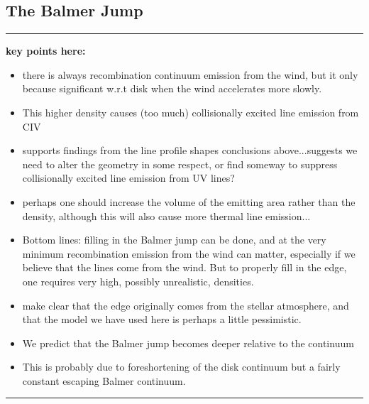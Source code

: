 \documentclass[preprint, a4paper, 11pt]{aastex}
\begin{document}
\subsection{The Balmer Jump}

\label{balmerjump}

\noindent\rule{16cm}{0.4pt}

{\bf
\noindent key points here:

\begin{itemize}
	\item there is always recombination continuum emission from the wind, but it
	only because significant w.r.t disk when the wind accelerates more slowly.
	\item This higher density causes (too much) collisionally excited line emission from CIV
	\item supports findings from the line profile shapes conclusions above...suggests
	we need to alter the geometry in some respect, or find someway to suppress
	collisionally excited line emission from UV lines?
	\item perhaps one should increase the volume of the emitting area rather than the density,
	although this will also cause more thermal line emission...
	\item Bottom lines: filling in the Balmer jump can be done, and at the very minimum recombination
	emission from the wind can matter, especially if we believe that the lines come from the wind. 
	But to properly fill in the edge, one requires very high, possibly unrealistic, densities.
	\item make clear that the edge originally comes from the stellar atmosphere, and that
	the model we have used here is perhaps a little pessimistic.
	\item We predict that the Balmer jump becomes deeper relative to the continuum 
	\item This is probably due to foreshortening of the disk continuum but a fairly constant
	escaping Balmer continuum.
\end{itemize}
}

\noindent\rule{16cm}{0.4pt}
\end{document}

